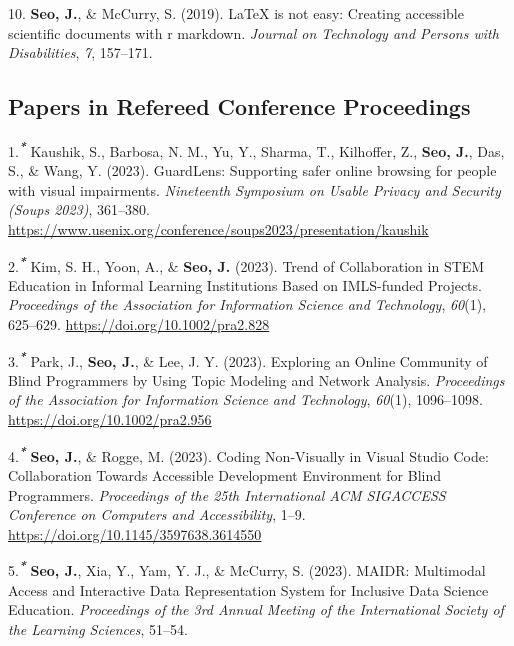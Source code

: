 \documentclass[11pt,a4paper,]{awesome-cv}
\begin{document}
\leavevmode\hypertarget{ref-seo2019arow}{}%
10. \textbf{Seo, J.}, \& McCurry, S. (2019). LaTeX is not easy: Creating
accessible scientific documents with r markdown. \emph{Journal on
  Technology and Persons with Disabilities}, \emph{7}, 157--171.

\hypertarget{papers-in-refereed-conference-proceedings}{%
  \subsection{Papers in Refereed Conference
    Proceedings}\label{papers-in-refereed-conference-proceedings}}

\hypertarget{bibliography}{}
\leavevmode\hypertarget{ref-289508}{}%
1.\textsuperscript{\emph{\textbf{*}}} Kaushik, S., Barbosa, N. M., Yu,
Y., Sharma, T., Kilhoffer, Z., \textbf{Seo, J.}, Das, S., \& Wang, Y.
(2023). GuardLens: Supporting safer online browsing for people with
visual impairments. \emph{Nineteenth Symposium on Usable Privacy and
  Security (Soups 2023)}, 361--380.
\url{https://www.usenix.org/conference/soups2023/presentation/kaushik}

\leavevmode\hypertarget{ref-kimTrendCollaborationSTEM2023a}{}%
2.\textsuperscript{\emph{\textbf{*}}} Kim, S. H., Yoon, A., \&
\textbf{Seo, J.} (2023). Trend of Collaboration in STEM Education in
Informal Learning Institutions Based on IMLS-funded Projects.
\emph{Proceedings of the Association for Information Science and
  Technology}, \emph{60}(1), 625--629.
\url{https://doi.org/10.1002/pra2.828}

\leavevmode\hypertarget{ref-parkExploringOnlineCommunity2023}{}%
3.\textsuperscript{\emph{\textbf{*}}} Park, J., \textbf{Seo, J.}, \&
Lee, J. Y. (2023). Exploring an Online Community of Blind Programmers by
Using Topic Modeling and Network Analysis. \emph{Proceedings of the
  Association for Information Science and Technology}, \emph{60}(1),
1096--1098. \url{https://doi.org/10.1002/pra2.956}

\leavevmode\hypertarget{ref-seoCodingNonVisuallyVisual2023}{}%
4.\textsuperscript{\emph{\textbf{*}}} \textbf{Seo, J.}, \& Rogge, M.
(2023). Coding Non-Visually in Visual Studio Code: Collaboration Towards
Accessible Development Environment for Blind Programmers.
\emph{Proceedings of the 25th International ACM SIGACCESS Conference on
  Computers and Accessibility}, 1--9.
\url{https://doi.org/10.1145/3597638.3614550}

\leavevmode\hypertarget{ref-seoMAIDRMultimodalAccess2023}{}%
5.\textsuperscript{\emph{\textbf{*}}} \textbf{Seo, J.}, Xia, Y., Yam, Y.
J., \& McCurry, S. (2023). MAIDR: Multimodal Access and Interactive Data
Representation System for Inclusive Data Science Education.
\emph{Proceedings of the 3rd Annual Meeting of the International Society
  of the Learning Sciences}, 51--54.
\end{document}
